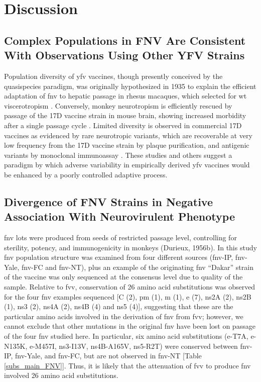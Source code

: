 \section{Discussion}
\subsection{Complex Populations in FNV Are Consistent With Observations Using Other YFV Strains}
Population diversity of \gls{yfv} vaccines, though presently conceived by the quasispecies paradigm, was originally hypothesized in 1935 to explain the efficient adaptation of \gls{fnv} to hepatic passage in rhesus macaques, which selected for \gls{wt} viscerotropism \parencite{FINDLAY:1935vu, Vignuzzi:2006ju}. Conversely, monkey neurotropism is efficiently rescued by passage of the 17D vaccine strain in mouse brain, showing increased morbidity after a single passage cycle \parencite{Meers:1959ui}. Limited diversity is observed in commercial 17D vaccines as evidenced by rare neurotropic variants, which are recoverable at very low frequency from the 17D vaccine strain by plaque purification, and antigenic variants by monoclonal immunoassay \parencite{Liprandi:1981ur,Gould:1989vu}. These studies and others suggest a paradigm by which adverse variability in empirically derived \gls{yfv} vaccines would be enhanced by a poorly controlled adaptive process. 

\subsection{Divergence of FNV Strains in Negative Association With Neurovirulent Phenotype}
\Gls{fnv} lots were produced from seeds of restricted passage level, controlling for sterility, potency, and immunogenicity in monkeys (Durieux, 1956b). In this study \gls{fnv} population structure was examined from four different sources (\gls{fnv}-IP, \gls{fnv}-Yale, \gls{fnv}-FC and \gls{fnv}-NT), plus an example of the originating \gls{fnv} “Dakar” strain of the vaccine was only sequenced at the consensus level due to quality of the sample. Relative to \gls{fvv}, conservation of 26 amino acid substitutions was observed for the four \gls{fnv} examples sequenced [C (2), \gls{pm} (1), \gls{m} (1), \gls{e} (7), \gls{ns}2A (2), \gls{ns}2B (1), \gls{ns}3 (2), \gls{ns}4A (2), \gls{ns}4B (4) and \gls{ns}5 (4)], suggesting that these are the particular amino acids involved in the derivation of \gls{fnv} from \gls{fvv}; however, we cannot exclude that other mutations in the original \gls{fnv} have been lost on passage of the four \gls{fnv} studied here. In particular, six amino acid substitutions (\gls{e}-T7A, \gls{e}-N135K, \gls{e}-M457I, \gls{ns}3-I13V, \gls{ns}4B-A165V, \gls{ns}5-R2T) were conserved between \gls{fnv}-IP, \gls{fnv}-Yale, and \gls{fnv}-FC, but are not observed in \gls{fnv}-NT [Table \ref{subs_main_FNV}]. Thus, it is likely that the attenuation of \gls{fvv} to produce \gls{fnv} involved 26 amino acid substitutions. 

